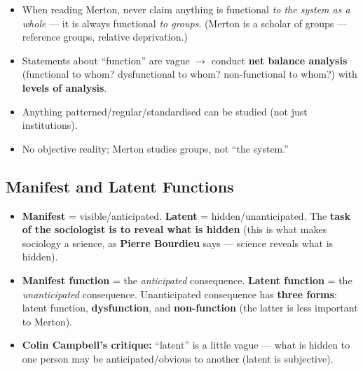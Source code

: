 \begin{CriticalPoint}
\begin{itemize}
\item When reading Merton, never claim anything is functional \textit{to the system as a whole} --- it is always functional \textit{to groups}. (Merton is a scholar of groups --- reference groups, relative deprivation.)
\end{itemize}
\end{CriticalPoint}

\begin{QuickRevision}
\begin{itemize}
\item Statements about ``function'' are vague $\rightarrow$ conduct \textbf{net balance analysis} (functional to whom? dysfunctional to whom? non-functional to whom?) with \textbf{levels of analysis}.
\item Anything patterned/regular/standardised can be studied (not just institutions).
\item No objective reality; Merton studies groups, not ``the system.''
\end{itemize}
\end{QuickRevision}

\sectiondivider

\subsection{Manifest and Latent Functions}

\begin{KeyConcept}
\begin{itemize}
\item \textbf{Manifest} = visible/anticipated. \textbf{Latent} = hidden/unanticipated. The \textbf{task of the sociologist is to reveal what is hidden} (this is what makes sociology a science, as \textbf{Pierre Bourdieu} says --- science reveals what is hidden).
\item \textbf{Manifest function} = the \textit{anticipated} consequence. \textbf{Latent function} = the \textit{unanticipated} consequence. Unanticipated consequence has \textbf{three forms}: latent function, \textbf{dysfunction}, and \textbf{non-function} (the latter is less important to Merton).
\item \textbf{Colin Campbell's critique:} ``latent'' is a little vague --- what is hidden to one person may be anticipated/obvious to another (latent is subjective).
\end{itemize}
\end{KeyConcept}

